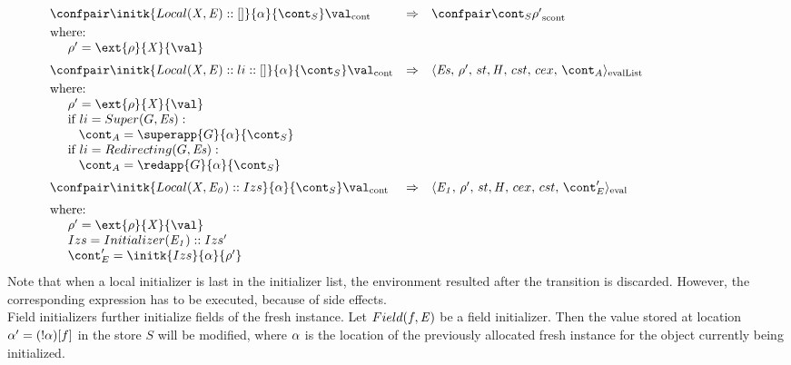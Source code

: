 \documentclass{article}
\begin{document}
\[
  \begin{array}{lcl@{\hspace{30mm}}}
	\contconf{\initk{Local(\variablemeta, \expr) :: []}{\loc}{\scont}}{\val}
	& \Rightarrow &
	\scontconf{\scont}{\env'}\\[1mm]
	\textrm{where:}\\
	\hspace{5mm}\env' = \ext{\env}{\variablemeta}{\val}\\[2mm]

	\contconf{\initk{Local(\variablemeta, \expr) :: li :: []}{\loc}{\scont}}{\val}
	& \Rightarrow &
	\evallistconf{\exprs}{\env'}{\strace}{\cstrace}{\cex}{\acont}\\[1mm]
	\textrm{where:}\\
	\hspace{5mm}\env' = \ext{\env}{\variablemeta}{\val}\\
	\hspace{5mm}\textrm{if } li = Super(G, \exprs):\\
	\hspace{8mm}\acont = \superapp{G}{\loc}{\scont}\\
	\hspace{5mm}\textrm{if } li = Redirecting(G, \exprs):\\
	\hspace{8mm}\acont = \redapp{G}{\loc}{\scont}\\[2mm]

	\contconf{\initk{Local(\variablemeta, \expri{0}) :: Izs}{\loc}{\scont}}{\val}
	& \Rightarrow &
	\evalconf{\expri{1}}{\env'}{st}{cex}{cst}{\econt'}\\[2mm]
	\textrm{where:}\\
	\hspace{5mm}\env' = \ext{\env}{\variablemeta}{\val}\\
	\hspace{5mm}Izs = Initializer(\expri{1}) :: Izs'\\
	\hspace{5mm}\econt' = \initk{Izs}{\loc}{\env'}
  \end{array}
\]
\noindent
Note that when a local initializer is last in the initializer list, the environment resulted after the transition is discarded. However, the corresponding expression has to be executed, because of side effects.
\\[2mm]
\noindent
Field initializers further initialize fields of the fresh instance. Let $Field(f, \mathit{E})$ be a field initializer. Then the value stored at location $\alpha' = (!\alpha)[f]$ in the store $S$ will be modified, where $\alpha$ is the location of the previously allocated fresh instance for the object currently being initialized.
\end{document}
